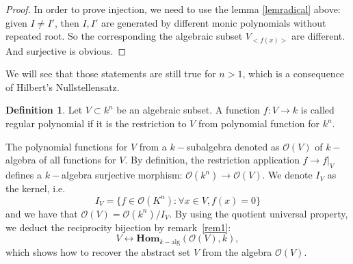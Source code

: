 \documentclass[12pt,a4paper,english]{article}
\theoremstyle{plain}
\theoremstyle{definition}
\newtheorem{defi}{Definition}
\theoremstyle{remark}
\newcommand{\homo}{\mathbf{Hom}}
\begin{document}
\begin{tcolorbox}
\begin{proof}

In order to prove injection, we need to use the lemma \ref{lemradical} above:
given $I\not= I'$, then $I, I'$ are generated by different monic polynomials without repeated root. So the corresponding the algebraic subset $V_{<f(x)>}$ are different. And surjective is obvious.
\end{proof}
\end{tcolorbox}

We will see that those statements are still true for $n>1$, which is a consequence of Hilbert's Nullstellensatz. 

\begin{defi}
Let $V\subset k^{n}$ be an algebraic subset. A function $f:V\rightarrow k$ is called regular polynomial if it is the restriction to $V$ from polynomial function for $k^{n}$.
\end{defi}
The polynomial functions for $V$ from a $k-$subalgebra denoted as $\mathcal{O}(V)$ of $k-$algebra of all functions for $V$. By definition, the restriction application $f\rightarrow f|_{V}$ defines a $k-$algebra surjective morphism: $\mathcal{O}(k^{n})\rightarrow \mathcal{O}(V)$. We denote $I_{V}$ as the kernel, i.e. 
\begin{equation*}
    I_{V}=\{f\in \mathcal{O}(K^{n}):\forall x\in V, f(x)=0\}
\end{equation*}
and we have that $\mathcal{O}(V)=\mathcal{O}(k^{n})/I_{V}$. By using the quotient universal property, we deduct the reciprocity bijection by remark\ \ref{rem1}:
\begin{equation*}
    V \leftrightarrow \homo_{k-\text{alg}}(\mathcal{O}(V),k),
\end{equation*}
which shows how to recover the abstract set $V$ from the algebra $\mathcal{O}(V)$. 
\end{document}
